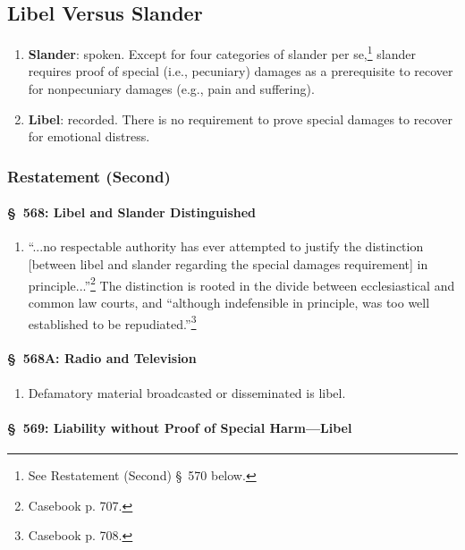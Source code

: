 \subsection{Libel Versus Slander}

\begin{enumerate}
    \item \textbf{Slander}: spoken. Except for four categories of slander per 
    se,\footnote{See Restatement (Second) \S\ 570 below.} slander 
    requires proof of special (i.e., pecuniary) damages as a prerequisite 
    to recover for nonpecuniary damages (e.g., pain and suffering).
    \item \textbf{Libel}: recorded. There is no requirement to prove special 
    damages to recover for emotional distress.
\end{enumerate}

\subsubsection{Restatement (Second)}

\paragraph{\S\ 568: Libel and Slander Distinguished}

\begin{enumerate}
    \item ``...no respectable authority has ever attempted to justify the 
    distinction [between libel and slander regarding the special damages 
    requirement] in principle...''\footnote{Casebook p. 707.} The distinction 
    is rooted in the divide between ecclesiastical and common law courts, and 
    ``although indefensible in principle, was too well established to be 
    repudiated.''\footnote{Casebook p. 708.}
\end{enumerate}

\paragraph{\S\ 568A: Radio and Television}

\begin{enumerate}
    \item Defamatory material broadcasted or disseminated is libel.
\end{enumerate}

\paragraph{\S\ 569: Liability without Proof of Special Harm---Libel}

